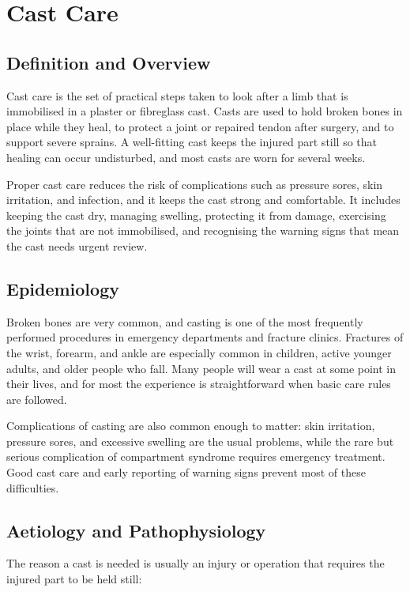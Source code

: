\chapter{Cast Care}

\section*{Definition and Overview}
Cast care is the set of practical steps taken to look after a limb that is immobilised in a plaster or fibreglass cast. Casts are used to hold broken bones in place while they heal, to protect a joint or repaired tendon after surgery, and to support severe sprains. A well-fitting cast keeps the injured part still so that healing can occur undisturbed, and most casts are worn for several weeks.

Proper cast care reduces the risk of complications such as pressure sores, skin irritation, and infection, and it keeps the cast strong and comfortable. It includes keeping the cast dry, managing swelling, protecting it from damage, exercising the joints that are not immobilised, and recognising the warning signs that mean the cast needs urgent review.

\section*{Epidemiology}
Broken bones are very common, and casting is one of the most frequently performed procedures in emergency departments and fracture clinics. Fractures of the wrist, forearm, and ankle are especially common in children, active younger adults, and older people who fall. Many people will wear a cast at some point in their lives, and for most the experience is straightforward when basic care rules are followed.

Complications of casting are also common enough to matter: skin irritation, pressure sores, and excessive swelling are the usual problems, while the rare but serious complication of compartment syndrome requires emergency treatment. Good cast care and early reporting of warning signs prevent most of these difficulties.

\section*{Aetiology and Pathophysiology}
The reason a cast is needed is usually an injury or operation that requires the injured part to be held still:

